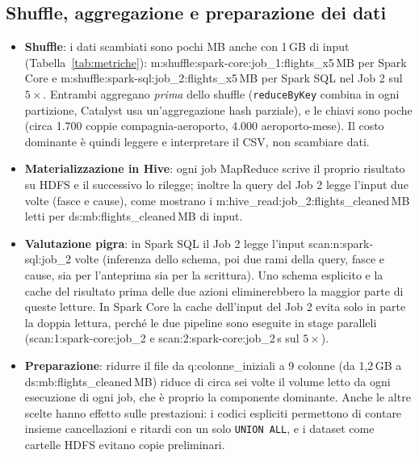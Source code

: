 \documentclass[11pt,a4paper]{article}
\newcommand{\Q}[1]{\csname q:#1\endcsname}
\newcommand{\DS}[2]{\csname ds:#1:#2\endcsname}
\newcommand{\M}[1]{\csname m:#1\endcsname}
\newcommand{\SC}[3]{\csname scan:#1:#2:#3\endcsname}
\newcommand{\code}[1]{\texttt{#1}}
\begin{document}
\subsection{Shuffle, aggregazione e preparazione dei dati}
\begin{itemize}
  \item \textbf{Shuffle}: i dati scambiati sono pochi MB anche con 1\,GB di input (Tabella~\ref{tab:metriche}):
        \M{shuffle:spark-core:job_1:flights_x5}\,MB per Spark Core e \M{shuffle:spark-sql:job_2:flights_x5}\,MB per
        Spark SQL nel Job 2 sul $5\times$. Entrambi aggregano \emph{prima} dello shuffle (\code{reduceByKey} combina in
        ogni partizione, Catalyst usa un'aggregazione hash parziale), e le chiavi sono poche (circa 1.700 coppie
        compagnia-aeroporto, 4.000 aeroporto-mese). Il costo dominante è quindi leggere e interpretare il CSV, non
        scambiare dati.
  \item \textbf{Materializzazione in Hive}: ogni job MapReduce scrive il proprio risultato su HDFS e il successivo lo
        rilegge; inoltre la query del Job 2 legge l'input due volte (fasce e cause), come mostrano i
        \M{hive_read:job_2:flights_cleaned}\,MB letti per \DS{mb}{flights_cleaned}\,MB di input.
  \item \textbf{Valutazione pigra}: in Spark SQL il Job 2 legge l'input \SC{n}{spark-sql}{job_2} volte (inferenza dello
        schema, poi due rami della query, fasce e cause, sia per l'anteprima sia per la scrittura). Uno schema esplicito
        e la cache del risultato prima delle due azioni eliminerebbero la maggior parte di queste letture. In Spark Core
        la cache dell'input del Job 2 evita solo in parte la doppia lettura, perché le due pipeline sono eseguite in
        stage paralleli (\SC{1}{spark-core}{job_2} e \SC{2}{spark-core}{job_2}\,s sul $5\times$).
  \item \textbf{Preparazione}: ridurre il file da \Q{colonne_iniziali} a 9 colonne (da 1,2\,GB a
        \DS{mb}{flights_cleaned}\,MB) riduce di circa sei volte il volume letto da ogni esecuzione di ogni job, che è
        proprio la componente dominante. Anche le altre scelte hanno effetto sulle prestazioni: i codici espliciti
        permettono di contare insieme cancellazioni e ritardi con un solo \code{UNION ALL}, e i dataset come cartelle
        HDFS evitano copie preliminari.
\end{itemize}

\end{document}
